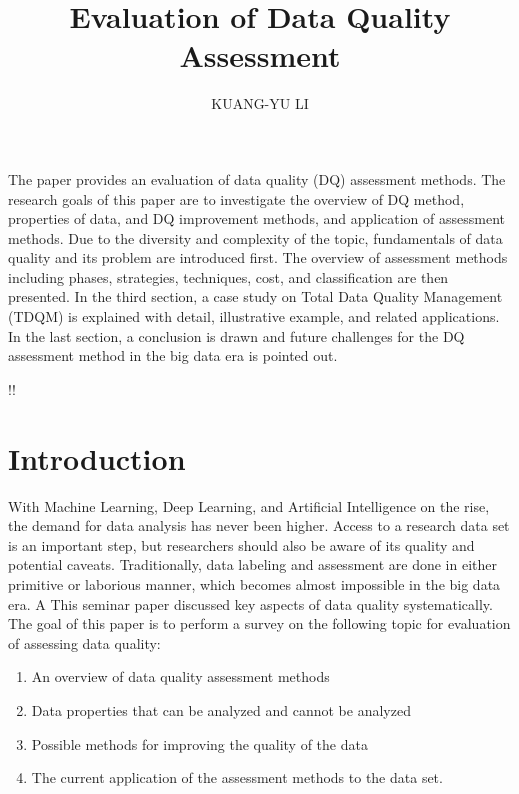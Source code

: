 \documentclass[pdftex,english,oribibl]{llncs}
\title{Evaluation of Data Quality Assessment}
\author{KUANG-YU LI}
\institute{University of Stuttgart\\Master Student in Information Technology \\70569 Stuttgart, Germany}
\makeatletter
\gdef\@keywords{}
\renewenvironment{abstract}{%
  \list{}{\advance\topsep by0.35cm\relax\small%
          \leftmargin=1cm%
          \labelwidth=\z@%
          \listparindent=\z@%
          \itemindent\listparindent%
          \rightmargin\leftmargin}%
          \item[\hskip\labelsep\bfseries\abstractname]}{%
  \if!\@keywords!\else{\item[~]\item[\hskip\labelsep\bfseries\keywordname]\@keywords}\fi%
  \endlist}
\makeatother
\begin{document}
\maketitle

\begin{abstract}
   The paper provides an evaluation of data quality (DQ) assessment methods. The research goals of this paper are to investigate the overview of DQ method, properties of data, and DQ improvement methods, and application of assessment methods. Due to the diversity and complexity of the topic, fundamentals of data quality and its problem are introduced first. The overview of assessment methods including phases, strategies, techniques, cost, and classification are then presented. In the third section, a case study on Total Data Quality Management (TDQM) is explained with detail, illustrative example, and related applications. In the last section, a conclusion is drawn and future challenges for the DQ assessment method in the big data era is pointed out.

\end{abstract}
\section{Introduction}
With Machine Learning, Deep Learning, and Artificial Intelligence on the rise, the demand for data analysis has never been higher.
Access to a research data set is an important step, but researchers should also be aware of its quality and potential caveats. Traditionally, data labeling and assessment are done in either primitive or laborious manner, which becomes almost impossible in the big data era. A
This seminar paper discussed key aspects of data quality systematically.
The goal of this paper is to perform a survey on the following topic for evaluation of assessing data quality:
\begin{enumerate}
    \item An overview of data quality assessment methods
    \item Data properties that can be analyzed and cannot be analyzed
    \item Possible methods for improving the quality of the data
    \item The current application of the assessment methods to the data set.
\end{enumerate}
\end{document}
